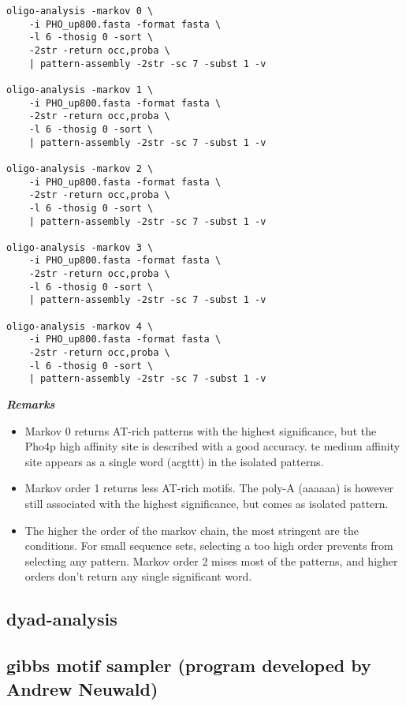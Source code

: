 \begin{verbatim}
oligo-analysis -markov 0 \
    -i PHO_up800.fasta -format fasta \
    -l 6 -thosig 0 -sort \
    -2str -return occ,proba \
    | pattern-assembly -2str -sc 7 -subst 1 -v

oligo-analysis -markov 1 \
    -i PHO_up800.fasta -format fasta \
    -2str -return occ,proba \
    -l 6 -thosig 0 -sort \
    | pattern-assembly -2str -sc 7 -subst 1 -v
	
oligo-analysis -markov 2 \
    -i PHO_up800.fasta -format fasta \
    -2str -return occ,proba \
    -l 6 -thosig 0 -sort \
    | pattern-assembly -2str -sc 7 -subst 1 -v
	
oligo-analysis -markov 3 \
    -i PHO_up800.fasta -format fasta \
    -2str -return occ,proba \
    -l 6 -thosig 0 -sort \
    | pattern-assembly -2str -sc 7 -subst 1 -v
	
oligo-analysis -markov 4 \
    -i PHO_up800.fasta -format fasta \
    -2str -return occ,proba \
    -l 6 -thosig 0 -sort \
    | pattern-assembly -2str -sc 7 -subst 1 -v
\end{verbatim}

\textit{\textbf{Remarks}}
\begin{itemize}
\item 
Markov 0 returns AT-rich patterns with the highest significance, but
the Pho4p high affinity site is described with a good accuracy. te
medium affinity site appears as a single word (acgttt) in the isolated
patterns.
\item 
Markov order 1 returns less AT-rich motifs. The poly-A (aaaaaa) is
however still associated with the highest significance, but comes as
isolated pattern.
\item 
The higher the order of the markov chain, the most stringent are the
conditions. For small sequence sets, selecting a too high order
prevents from selecting any pattern. Markov order 2 mises most of the
patterns, and higher orders don't return any single significant word.
\end{itemize}

\subsection{dyad-analysis}



\subsection{gibbs motif sampler (program developed by Andrew Neuwald)}




